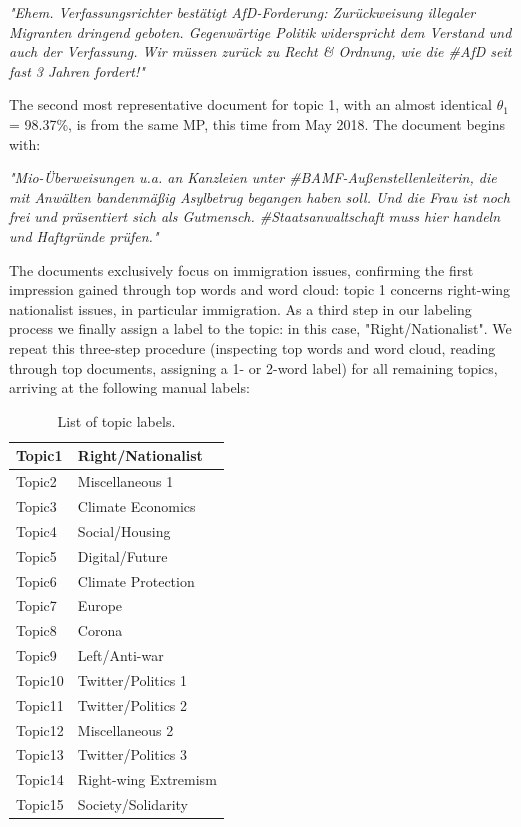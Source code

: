 \vspace{0.5cm}
\noindent
\textit{"Ehem. Verfassungsrichter bestätigt AfD-Forderung: Zurückweisung illegaler Migranten dringend geboten. Gegenwärtige Politik widerspricht dem Verstand und auch der Verfassung. Wir müssen zurück zu Recht \& Ordnung, wie die \#AfD seit fast 3 Jahren fordert!"}
\vspace{0.5cm}

The second most representative document for topic 1, with an almost identical $\theta_1$ = 98.37\%, is from the same MP, this time from May 2018. The document begins with:

\vspace{0.5cm}
\noindent
\textit{"Mio-Überweisungen u.a. an Kanzleien unter \#BAMF-Außenstellenleiterin, die mit Anwälten bandenmäßig Asylbetrug begangen haben soll. Und die Frau ist noch frei und präsentiert sich als Gutmensch. \#Staatsanwaltschaft muss hier handeln und Haftgründe prüfen."}
\vspace{0.5cm}

The documents exclusively focus on immigration issues, confirming the first impression gained through top words and word cloud: topic 1 concerns right-wing nationalist issues, in particular immigration. As a third step in our labeling process we finally assign a label to the topic: in this case, "Right/Nationalist". We repeat this three-step procedure (inspecting top words and word cloud, reading through top documents, assigning a 1- or 2-word label) for all remaining topics, arriving at the following manual labels:

\begin{table}[h!]
	\centering
	\captionsetup{justification=centering,margin=2cm}
	\begin{tabular}{|l|l|}
	\hline
	Topic1  & Right/Nationalist    \\ \hline
	Topic2  & Miscellaneous 1      \\ \hline
	Topic3  & Climate Economics    \\ \hline
	Topic4  & Social/Housing       \\ \hline
	Topic5  & Digital/Future       \\ \hline
	Topic6  & Climate Protection   \\ \hline
	Topic7  & Europe               \\ \hline
	Topic8  & Corona               \\ \hline
	Topic9  & Left/Anti-war        \\ \hline
	Topic10 & Twitter/Politics 1   \\ \hline
	Topic11 & Twitter/Politics 2   \\ \hline
	Topic12 & Miscellaneous 2      \\ \hline
	Topic13 & Twitter/Politics 3   \\ \hline
	Topic14 & Right-wing Extremism \\ \hline
	Topic15 & Society/Solidarity   \\ \hline
	\end{tabular}
	\caption{List of topic labels.}
	\label{Tab:labels}
\end{table}

